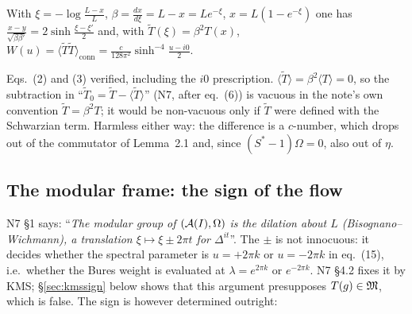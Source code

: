\documentclass[11pt]{article}
\begin{document}
\begin{lemma}[N7 eq.~(2)--(3)]\label{lem:W}
With $\xi=-\log\frac{L-x}{L}$, $\beta=\frac{dx}{d\xi}=L-x=Le^{-\xi}$, $x=L(1-e^{-\xi})$ one has
$\frac{x-y}{\sqrt{\beta\beta'}}=2\sinh\frac{\xi-\xi'}2$ and, with $\widetilde T(\xi)=\beta^2T(x)$,
$W(u)=\langle\widetilde T\widetilde T\rangle_{\mathrm{conn}}=\frac{c}{128\pi^2}\sinh^{-4}\frac{u-i0}2$.
\end{lemma}
\begin{verdictok}
Eqs.~(2) and (3) verified, including the $i0$ prescription.  $\langle\widetilde T\rangle=\beta^2\langle T\rangle=0$,
so the subtraction in ``$\widetilde T_0=\widetilde T-\langle\widetilde T\rangle$'' (N7, after eq.~(6)) is vacuous
in the note's own convention $\widetilde T=\beta^2T$; it would be non-vacuous only if $\widetilde T$ were defined
with the Schwarzian term.  Harmless either way: the difference is a $c$-number, which drops out of the commutator
of Lemma~2.1 and, since $(S^*-1)\Omega=0$, also out of $\eta$.
\end{verdictok}
\subsection{The modular frame: the sign of the flow}\label{sec:bwsign}
N7 \S1 says: ``\emph{The modular group of $(\mathcal A(I),\Omega)$ is the dilation about $L$ (Bisognano--Wichmann), a
translation $\xi\mapsto\xi\pm2\pi t$ for $\Delta^{it}$}''.  The $\pm$ is not innocuous: it decides whether the
spectral parameter is $u=+2\pi k$ or $u=-2\pi k$ in eq.~(15), i.e.\ whether the Bures weight is evaluated at
$\lambda=e^{2\pi k}$ or $e^{-2\pi k}$.  N7 \S4.2 fixes it by KMS; \S\ref{sec:kmssign} below shows that this
argument presupposes $T(g)\in\mathfrak M$, which is false.  The sign is however determined outright:
\end{document}
